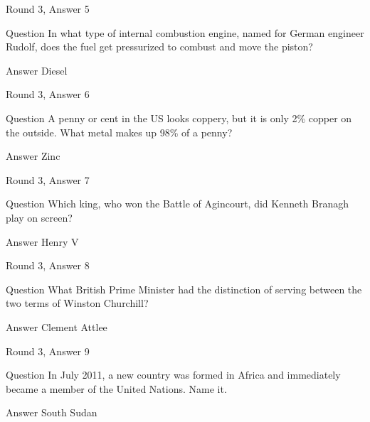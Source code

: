 \documentclass[11pt]{beamer}
\begin{document}
\begin{frame}{Round 3, Answer 5}
\begin{block}{Question}
In what type of internal combustion engine, named for German engineer Rudolf, does the fuel get pressurized to combust and move the piston\@?
\end{block}
\pause{}
\begin{block}{Answer}
Diesel
\end{block}
\end{frame}
    

\begin{frame}{Round 3, Answer 6}
\begin{block}{Question}
A penny or cent in the US looks coppery, but it is only 2\% copper on the outside. What metal makes up 98\% of a penny\@?
\end{block}
\pause{}
\begin{block}{Answer}
Zinc
\end{block}
\end{frame}
    

\begin{frame}{Round 3, Answer 7}
\begin{block}{Question}
Which king, who won the Battle of Agincourt, did Kenneth Branagh play on screen\@?
\end{block}
\pause{}
\begin{block}{Answer}
Henry V
\end{block}
\end{frame}
    

\begin{frame}{Round 3, Answer 8}
\begin{block}{Question}
What British Prime Minister had the distinction of serving between the two terms of Winston Churchill\@?
\end{block}
\pause{}
\begin{block}{Answer}
Clement Attlee
\end{block}
\end{frame}
    

\begin{frame}{Round 3, Answer 9}
\begin{block}{Question}
In July 2011, a new country was formed in Africa and immediately became a member of the United Nations. Name it.
\end{block}
\pause{}
\begin{block}{Answer}
South Sudan
\end{block}
\end{frame}
    
\end{document}
